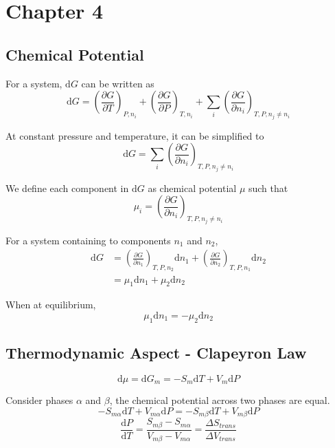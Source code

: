 \documentclass[letterpaper]{article}
\newcommand{\diff}{\mathrm{d}}
\begin{document}
\newpage
\section*{Chapter 4}
\subsection*{Chemical Potential}
For a system, $\diff G$ can be written as
\begin{equation*}
    \diff G=\left(\frac{\partial G}{\partial T}\right)_{P,n_i}+\left(\frac{\partial G}{\partial P}\right)_{T,n_i}
    +\sum_i\left(\frac{\partial G}{\partial n_i}\right)_{T,P,n_j\neq n_i}
\end{equation*}

At constant pressure and temperature, it can be simplified to
\begin{equation*}
    \diff G=\sum_i\left(\frac{\partial G}{\partial n_i}\right)_{T,P,n_j\neq n_i}
\end{equation*}

We define each component in $\diff G$ as chemical potential $\mu$ such that
\begin{equation*}
    \mu_i=\left(\frac{\partial G}{\partial n_i}\right)_{T,P,n_j\neq n_i}
\end{equation*}

For a system containing to components $n_1$ and $n_2$,
\begin{equation*}
    \begin{aligned}
        \diff G & =\left(\frac{\partial G}{\partial n_1}\right)_{T,P,n_2}\diff n_1+
        \left(\frac{\partial G}{\partial n_2}\right)_{T,P,n_1}\diff n_2             \\
                & =\mu_1\diff n_1+\mu_2\diff n_2
    \end{aligned}
\end{equation*}

When at equilibrium,
\begin{equation*}
    \mu_1\diff n_1=-\mu_2\diff n_2
\end{equation*}
\subsection*{Thermodynamic Aspect - Clapeyron Law}
\begin{equation*}
    \diff\mu=\diff G_m=-S_m\diff T+V_m\diff P
\end{equation*}

Consider phases $\alpha$ and $\beta$, the chemical potential across two phases are equal.
\begin{equation*}
    -S_{m\alpha}\diff T+V_{m\alpha}\diff P=-S_{m\beta}\diff T+V_{m\beta}\diff P
\end{equation*}
\begin{equation*}
    \boxed{\frac{\diff P}{\diff T}=\frac{S_{m\beta}-S_{m\alpha}}{V_{m\beta}-V_{m\alpha}}
    =\frac{\Delta S_{trans}}{\Delta V_{trans}}}
\end{equation*}
\end{document}
